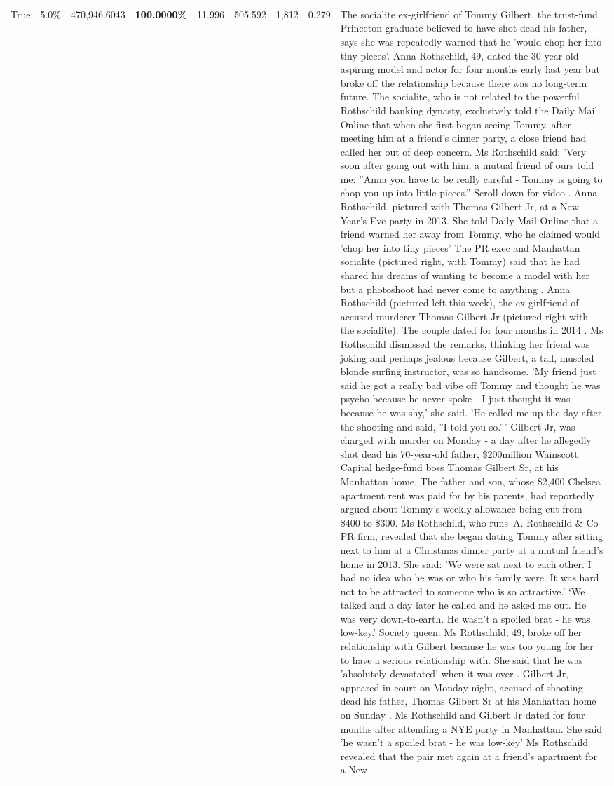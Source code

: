 \begin{table}[H]
\begin{tabular}{lllrlllll}
True & 5.0\% & 470,946.6043 & \bfseries \color{red} 100.0000\% & 11.996 & 505.592 & 1,812 & 0.279 & The socialite ex-girlfriend of Tommy Gilbert, the trust-fund Princeton graduate believed to have shot dead his father, says she was repeatedly warned that he 'would chop her into tiny pieces'. Anna Rothschild, 49, dated the 30-year-old aspiring model and actor for four months early last year but broke off the relationship because there was no long-term future. The socialite, who is not related to the powerful Rothschild banking dynasty, exclusively told the Daily Mail Online that when she first began seeing Tommy, after meeting him at a friend's dinner party, a close friend had called her out of deep concern. Ms Rothschild said: 'Very soon after going out with him, a mutual friend of ours told me: ''Anna you have to be really careful - Tommy is going to chop you up into little pieces.'' Scroll down for video . Anna Rothschild, pictured with Thomas Gilbert Jr, at a New Year's Eve party in 2013. She told Daily Mail Online that a friend warned her away from Tommy, who he claimed would 'chop her into tiny pieces' The PR exec and Manhattan socialite (pictured right, with Tommy) said that he had shared his dreams of wanting to become a model with her but a photoshoot had never come to anything . Anna Rothschild (pictured left this week), the ex-girlfriend of accused murderer Thomas Gilbert Jr (pictured right with the socialite). The couple dated for four months in 2014 . Ms Rothschild dismissed the remarks, thinking her friend was joking and perhaps jealous because Gilbert, a tall, muscled blonde surfing instructor, was so handsome. 'My friend just said he got a really bad vibe off Tommy and thought he was psycho because he never spoke - I just thought it was because he was shy,' she said. 'He called me up the day after the shooting and said, ''I told you so.''' Gilbert Jr, was charged with murder on Monday - a day after he allegedly shot dead his 70-year-old father, \$200million Wainscott Capital hedge-fund boss Thomas Gilbert Sr, at his Manhattan home. The father and son, whose \$2,400 Chelsea apartment rent was paid for by his parents, had reportedly argued about Tommy's weekly allowance being cut from \$400 to \$300. Ms Rothschild, who runs A. Rothschild \& Co PR firm, revealed that she began dating Tommy after sitting next to him at a Christmas dinner party at a mutual friend's home in 2013. She said: 'We were sat next to each other. I had no idea who he was or who his family were. It was hard not to be attracted to someone who is so attractive.' ‘We talked and a day later he called and he asked me out. He was very down-to-earth. He wasn’t a spoiled brat - he was low-key.’ Society queen: Ms Rothschild, 49, broke off her relationship with Gilbert because he was too young for her to have a serious relationship with. She said that he was 'absolutely devastated' when it was over . Gilbert Jr, appeared in court on Monday night, accused of shooting dead his father, Thomas Gilbert Sr at his Manhattan home on Sunday . Ms Rothschild and Gilbert Jr dated for four months after attending a NYE party in Manhattan. She said 'he wasn't a spoiled brat - he was low-key' Ms Rothschild revealed that the pair met again at a friend’s apartment for a New 
\end{tabular}
\end{table}
